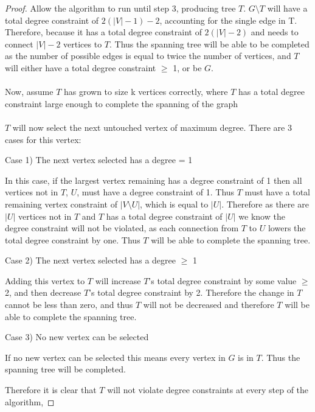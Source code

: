 \documentclass{article}
\begin{document}
\begin{proof}
Allow the algorithm to run until step 3, producing tree $T$. $G \setminus T$ will have a total degree constraint of $2(|V|-1)-2$, accounting for the single edge in T. Therefore, because it has a total degree constraint of $2(|V|-2)$ and needs to connect $|V|-2$ vertices to $T$. Thus the spanning tree will be able to be completed as the number of possible edges is equal to twice the number of vertices, and $T$ will either have a total degree constraint $\geq$ 1, or be $G$. 
\\
\\
Now, assume $T$ has grown to size k vertices correctly, where $T$ has a total degree constraint large enough to complete the spanning of the graph
\\\\
$T$ will now select the next untouched vertex of maximum degree. There are 3 cases for this vertex:

    \setlength\parindent{12pt} 
    Case 1) The next vertex selected has a degree = 1 \par
        \setlength\parindent{24pt}\hangindent=24pt 
        In this case, if the largest vertex remaining has a degree constraint of 1 then all vertices not in $T$, $U$, must
        have a degree constraint of 1. Thus $T$ must have a total remaining vertex constraint of $|V \setminus U|$, which is equal to  $|U|$. Therefore as there are $|U|$ vertices not in $T$ and $T$ has a total degree constraint of $|U|$ we know the degree constraint will not be violated, as each connection from $T$ to $U$ lowers the total degree constraint by one.  Thus $T$ will be able to complete the spanning tree.
        \par
        
    \setlength\parindent{12pt}
    Case 2) The next vertex selected has a degree $\geq$ 1\par
        \setlength\parindent{24pt}\hangindent=24pt 
        Adding this vertex to $T$ will increase $T$'s total degree constraint by some value $\geq$ 2, and then decrease $T$'s total degree constraint by 2.
        Therefore the change in $T$ cannot be less than zero, and thus $T$ will not be decreased and therefore $T$ will be able to complete the spanning tree.
        \par


    \setlength\parindent{12pt}
    Case 3) No new vertex can be selected\par
        \setlength\parindent{24pt}\hangindent=24pt 
        If no new vertex can be selected this means every vertex in $G$ is in $T$. Thus the spanning tree will be completed.
        \par
        
    \setlength\parindent{0pt}\hangindent=0pt
    Therefore it is clear that $T$ will not violate degree constraints at every step of the algorithm,

\end{proof}
\end{document}
